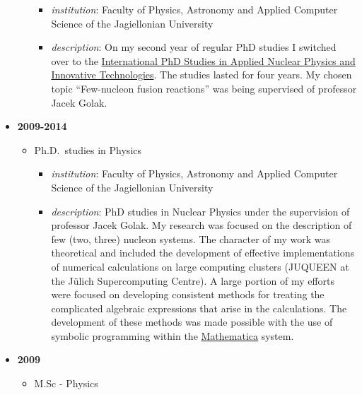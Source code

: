 \begin{itemize}
\begin{itemize}
    \begin{itemize}
    \tightlist
    \item
      \emph{institution}: Faculty of Physics, Astronomy and Applied
      Computer Science of the Jagiellonian University
    \item
      \emph{description}: On my second year of regular PhD studies I
      switched over to the
      \href{https://fais.uj.edu.pl/applied-nuclear-physics-and-innovative-technologies}{International
      PhD Studies in Applied Nuclear Physics and Innovative
      Technologies}. The studies lasted for four years. My chosen topic
      ``Few-nucleon fusion reactions'' was being supervised of professor
      Jacek Golak.
    \end{itemize}
  \end{itemize}
\item
  \textbf{2009-2014}

  \begin{itemize}
  \tightlist
  \item
    Ph.D.~studies in Physics

    \begin{itemize}
    \tightlist
    \item
      \emph{institution}: Faculty of Physics, Astronomy and Applied
      Computer Science of the Jagiellonian University
    \item
      \emph{description}: PhD studies in Nuclear Physics under the
      supervision of professor Jacek Golak. My research was focused on
      the description of few (two, three) nucleon systems. The character
      of my work was theoretical and included the development of
      effective implementations of numerical calculations on large
      computing clusters (JUQUEEN at the Jülich Supercomputing Centre).
      A large portion of my efforts were focused on developing
      consistent methods for treating the complicated algebraic
      expressions that arise in the calculations. The development of
      these methods was made possible with the use of symbolic
      programming within the
      \href{https://www.wolfram.com/mathematica/}{Mathematica} system.
    \end{itemize}
  \end{itemize}
\item
  \textbf{2009}

  \begin{itemize}
  \tightlist
  \item
    M.Sc - Physics


\end{itemize}
\end{itemize}
